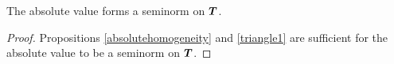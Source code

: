 \begin{corollary}\label{gseminorm}
  The absolute value forms a seminorm on $\boldsymbol{T}$.
  \begin{proof}  
    Propositions \ref{absolutehomogeneity} and \ref{triangle1} are 
    sufficient for the absolute value to be a seminorm on
    $\boldsymbol{T}$.
  \end{proof}
\end{corollary}






